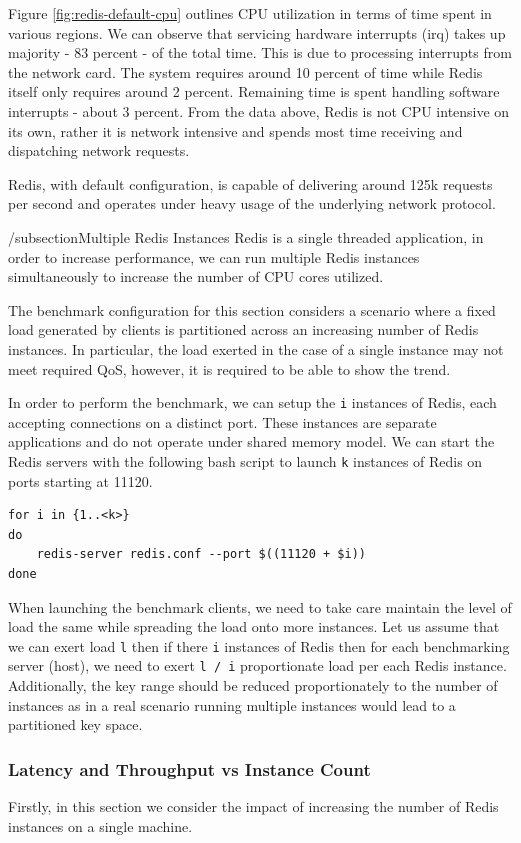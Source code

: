 Figure \ref{fig:redis-default-cpu} outlines CPU utilization in terms of time spent in various regions. We can observe that servicing hardware interrupts (irq) takes up majority - 83 percent - of the total time. This is due to processing interrupts from the network card. The system requires around 10 percent of time while Redis itself only requires around 2 percent. Remaining time is spent handling software interrupts - about 3 percent. From the data above, Redis is not CPU intensive on its own, rather it is network intensive and spends most time receiving and dispatching network requests.


Redis, with default configuration, is capable of delivering around 125k requests per second and operates under heavy usage of the underlying network protocol.


/subsection{Multiple Redis Instances}
Redis is a single threaded application, in order to increase performance, we can run multiple Redis instances simultaneously to increase the number of CPU cores utilized.

The benchmark configuration for this section considers a scenario where a fixed load generated by clients is partitioned across an increasing number of Redis instances. In particular, the load exerted in the case of a single instance may not meet required QoS, however, it is required to be able to show the trend.

In order to perform the benchmark, we can setup the \texttt{i} instances of Redis, each accepting connections on a distinct port. These instances are separate applications and do not operate under shared memory model. We can start the Redis servers with the following bash script to launch \texttt{k} instances of Redis on ports starting at 11120.

\begin{lstlisting}
for i in {1..<k>}
do
    redis-server redis.conf --port $((11120 + $i))
done
\end{lstlisting}

When launching the benchmark clients, we need to take care maintain the level of load the same while spreading the load onto more instances. Let us assume that we can exert load \texttt{l} then if there \texttt{i} instances of Redis then for each benchmarking server (host), we need to exert \texttt{l / i} proportionate load per each Redis instance. Additionally, the key range should be reduced proportionately to the number of instances as in a real scenario running multiple instances would lead to a partitioned key space.

\subsubsection{Latency and Throughput vs Instance Count}

Firstly, in this section we consider the impact of increasing the number of Redis instances on a single machine.